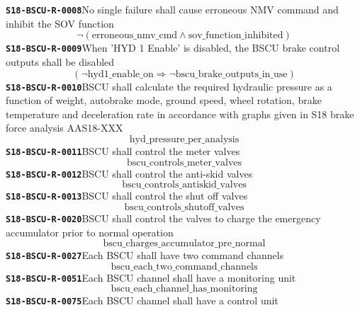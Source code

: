 \documentclass[11pt,a4paper]{article}
\begin{document}
\noindent\textbf{\texttt{S18-BSCU-R-0008}}\quad No single failure shall cause erroneous NMV command and inhibit the SOV function
\begin{dmath*}
\neg (\text{erroneous\_nmv\_cmd} \wedge \text{sov\_function\_inhibited})
\end{dmath*}
\noindent\textbf{\texttt{S18-BSCU-R-0009}}\quad When 'HYD 1 Enable' is disabled, the BSCU brake control outputs shall be disabled
\begin{dmath*}
(\neg \text{hyd1\_enable\_on} \Rightarrow \neg \text{bscu\_brake\_outputs\_in\_use})
\end{dmath*}
\noindent\textbf{\texttt{S18-BSCU-R-0010}}\quad BSCU shall calculate the required hydraulic pressure as a function of weight, autobrake mode, ground speed, wheel rotation, brake temperature and deceleration rate in accordance with graphs given in S18 brake force analysis AAS18-XXX
\begin{dmath*}
\text{hyd\_pressure\_per\_analysis}
\end{dmath*}
\noindent\textbf{\texttt{S18-BSCU-R-0011}}\quad BSCU shall control the meter valves
\begin{dmath*}
\text{bscu\_controls\_meter\_valves}
\end{dmath*}
\noindent\textbf{\texttt{S18-BSCU-R-0012}}\quad BSCU shall control the anti-skid valves
\begin{dmath*}
\text{bscu\_controls\_antiskid\_valves}
\end{dmath*}
\noindent\textbf{\texttt{S18-BSCU-R-0013}}\quad BSCU shall control the shut off valves
\begin{dmath*}
\text{bscu\_controls\_shutoff\_valves}
\end{dmath*}
\noindent\textbf{\texttt{S18-BSCU-R-0020}}\quad BSCU shall control the valves to charge the emergency accumulator prior to normal operation
\begin{dmath*}
\text{bscu\_charges\_accumulator\_pre\_normal}
\end{dmath*}
\noindent\textbf{\texttt{S18-BSCU-R-0027}}\quad Each BSCU shall have two command channels
\begin{dmath*}
\text{bscu\_each\_two\_command\_channels}
\end{dmath*}
\noindent\textbf{\texttt{S18-BSCU-R-0051}}\quad Each BSCU channel shall have a monitoring unit
\begin{dmath*}
\text{bscu\_each\_channel\_has\_monitoring}
\end{dmath*}
\noindent\textbf{\texttt{S18-BSCU-R-0075}}\quad Each BSCU channel shall have a control unit
\end{document}
